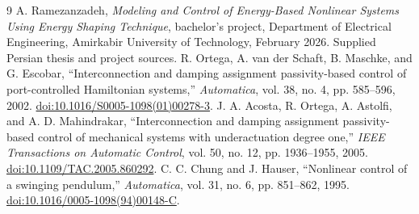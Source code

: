 \documentclass[11pt,a4paper]{article}
\begin{document}
\begin{thebibliography}{9}\small
{} A. Ramezanzadeh, \emph{Modeling and Control of Energy-Based Nonlinear Systems Using Energy Shaping Technique}, bachelor's project, Department of Electrical Engineering, Amirkabir University of Technology, February 2026. Supplied Persian thesis and project sources.
 R. Ortega, A. van der Schaft, B. Maschke, and G. Escobar, ``Interconnection and damping assignment passivity-based control of port-controlled Hamiltonian systems,'' \emph{Automatica}, vol. 38, no. 4, pp. 585--596, 2002. \href{https://doi.org/10.1016/S0005-1098(01)00278-3}{doi:10.1016/S0005-1098(01)00278-3}.
 J. A. Acosta, R. Ortega, A. Astolfi, and A. D. Mahindrakar, ``Interconnection and damping assignment passivity-based control of mechanical systems with underactuation degree one,'' \emph{IEEE Transactions on Automatic Control}, vol. 50, no. 12, pp. 1936--1955, 2005. \href{https://doi.org/10.1109/TAC.2005.860292}{doi:10.1109/TAC.2005.860292}.
 C. C. Chung and J. Hauser, ``Nonlinear control of a swinging pendulum,'' \emph{Automatica}, vol. 31, no. 6, pp. 851--862, 1995. \href{https://doi.org/10.1016/0005-1098(94)00148-C}{doi:10.1016/0005-1098(94)00148-C}.
\end{thebibliography}
\end{document}
